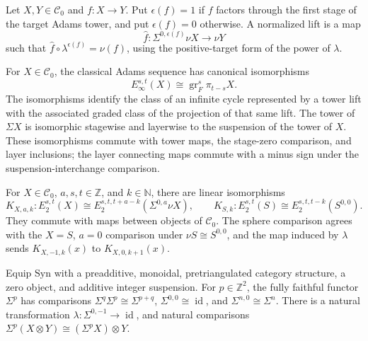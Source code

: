 \begin{definition}
\label{frontier:AdamsSynthetic:8e642612876d}
Let $X,Y\in\mathcal C_0$ and $f\colon X\to Y$. Put $\epsilon(f)=1$ if $f$ factors through the first stage of the target Adams tower, and put $\epsilon(f)=0$ otherwise. A normalized lift is a map
\[
\widehat f\colon\Sigma^{0,\epsilon(f)}\nu X\longrightarrow\nu Y
\]
such that $\widehat f\circ\lambda^{\epsilon(f)}=\nu(f)$, using the positive-target form of the power of $\lambda$.
\end{definition}

\begin{definition}
\label{frontier:AdamsSynthetic:9a4b26f47efd}
For $X\in\mathcal C_0$, the classical Adams sequence has canonical isomorphisms
\[
E_\infty^{s,t}(X)\cong\operatorname{gr}_F^s\pi_{t-s}X.
\]
The isomorphisms identify the class of an infinite cycle represented by a tower lift with the associated graded class of the projection of that same lift. The tower of $\Sigma X$ is isomorphic stagewise and layerwise to the suspension of the tower of $X$. These isomorphisms commute with tower maps, the stage-zero comparison, and layer inclusions; the layer connecting maps commute with a minus sign under the suspension-interchange comparison.
\end{definition}

\begin{definition}
\label{frontier:AdamsSynthetic:a5b004b4748d}
For $X\in\mathcal C_0$, $a,s,t\in\mathbb Z$, and $k\in\mathbb N$, there are linear isomorphisms
\[
K_{X,a,k}\colon E_2^{s,t}(X)\cong E_2^{s,t,t+a-k}(\Sigma^{0,a}\nu X),\qquad
K_{S,k}\colon E_2^{s,t}(S)\cong E_2^{s,t,t-k}(S^{0,0}).
\]
They commute with maps between objects of $\mathcal C_0$. The sphere comparison agrees with the $X=S$, $a=0$ comparison under $\nu S\cong S^{0,0}$, and the map induced by $\lambda$ sends $K_{X,-1,k}(x)$ to $K_{X,0,k+1}(x)$.
\end{definition}

\begin{definition}
\label{frontier:AdamsSynthetic:a9091f3f5cf2}
Equip $\mathrm{Syn}$ with a preadditive, monoidal, pretriangulated category structure, a zero object, and additive integer suspension. For $p\in\mathbb Z^2$, the fully faithful functor $\Sigma^p$ has comparisons $\Sigma^q\Sigma^p\cong\Sigma^{p+q}$, $\Sigma^{0,0}\cong\operatorname{id}$, and $\Sigma^{n,0}\cong\Sigma^n$. There is a natural transformation $\lambda\colon\Sigma^{0,-1}\to\operatorname{id}$, and natural comparisons $\Sigma^p(X\otimes Y)\cong(\Sigma^pX)\otimes Y$.
\end{definition}

